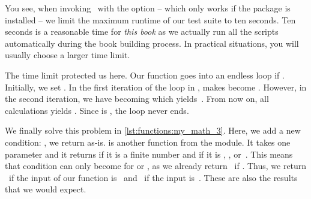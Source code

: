 You see, when invoking \pytest\ with the option  -- which only works if the package  is installed -- we limit the maximum runtime of our test suite to ten seconds.
Ten seconds is a reasonable time for \emph{this book} as we actually run all the scripts automatically during the book building process.
In practical situations, you will usually choose a larger time limit.%
%
%
%
\begin{sloppypar}%
The time limit protected us here.
Our  function goes into an endless loop if .
Initially, we set .
In the first iteration of the loop in ,  makes  become .
However, in the second iteration, we have  becoming  which yields~.
From now on, all calculations yields .
Since  is , the loop never ends.%
\end{sloppypar}%
%
%
%
%
%
%
%
\begin{sloppypar}%
We finally solve this problem in \cref{lst:functions:my_math_3}.
Here, we add a new condition: , we return  as-is.
 is another function from the  module.
It takes one parameter and it returns  if it is a finite number and  if it is , , or~.
This means that condition can only become  for  or , as we already return~ if .
Thus, we return ~if the input of our function is~ and ~if the input is~.
These are also the results that we would expect.%
\end{sloppypar}%
